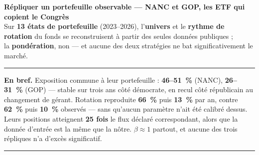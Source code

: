 \documentclass[9pt,a4paper]{extarticle}
\begin{document}
\begin{center}
{\large\bfseries Répliquer un portefeuille observable --- NANC et GOP, les ETF qui copient le Congrès}\\[0.6mm]
{\small Sur \textbf{13 états de portefeuille} (2023--2026), l'\textbf{univers} et le \textbf{rythme de rotation} du fonds se reconstruisent à partir des seules données publiques ;\\[0.2mm]
la \textbf{pondération}, non --- et aucune des deux stratégies ne bat significativement le marché.}
\end{center}
\vspace{0.6mm}
\hrule\vspace{0.9mm}
{\footnotesize
\textbf{En bref.} Exposition commune à leur portefeuille : \textbf{46--51~\%} (NANC), \textbf{26--31~\%} (GOP) --- stable sur trois ans côté démocrate, en recul côté républicain au changement de gérant.
Rotation reproduite \textbf{66~\%} puis \textbf{13~\%} par an, contre \textbf{62~\%} puis \textbf{10~\%} observés --- sans qu'aucun paramètre n'ait été calibré dessus.
Leurs positions atteignent \textbf{25 fois} le flux déclaré correspondant, alors que la donnée d'entrée est la même que la nôtre.
$\beta\approx1$ partout, et aucune des trois répliques n'a d'excès significatif.
\par\vspace{0.5mm}
}
\vspace{0.9mm}\hrule\vspace{1.2mm}
\end{document}
